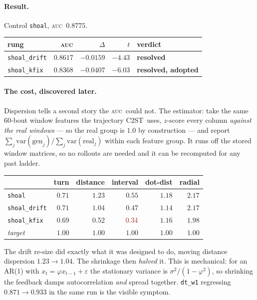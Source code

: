 \documentclass[11pt,a4paper]{article}
\newcommand{\win}[1]{\textcolor{winc}{\textbf{#1}}}
\newcommand{\lose}[1]{\textcolor{losec}{#1}}
\newcommand{\auc}{\textsc{auc}}
\newcommand{\ctst}{C2ST}
\newcommand{\code}[1]{\texttt{\small #1}}
\begin{document}
\paragraph{Result.} Control \code{shoal}, \auc\ $0.8775$.
\begin{center}\small
\begin{tabular}{lrrrl}
\toprule
rung & \auc{} & $\Delta$ & $t$ & verdict \\
\midrule
\code{shoal\_drift} & $0.8617$ & $-0.0159$ & $-4.43$ & \win{resolved} \\
\code{shoal\_kfix}  & $\mathbf{0.8368}$ & $\mathbf{-0.0407}$ & $-6.03$ & \win{resolved, adopted} \\
\bottomrule
\end{tabular}
\end{center}

\paragraph{The cost, discovered later.} Dispersion tells a second story the \auc\ could
not. The estimator: take the same 60-bout window features the trajectory \ctst\ uses,
$z$-score every column \emph{against the real windows} --- so the real group is $1.0$ by
construction --- and report $\sum_j \mathrm{var}(\text{gen}_j) / \sum_j
\mathrm{var}(\text{real}_j)$ within each feature group. It runs off the stored window
matrices, so no rollouts are needed and it can be recomputed for any past ladder.
\begin{center}\small
\begin{tabular}{lrrrrr}
\toprule
& turn & \textbf{distance} & \textbf{interval} & dot-dist & radial \\
\midrule
\code{shoal}       & $0.71$ & $1.23$ & $0.55$ & $1.18$ & $2.17$ \\
\code{shoal\_drift}& $0.71$ & $\mathbf{1.04}$ & $0.47$ & $1.14$ & $2.17$ \\
\code{shoal\_kfix} & $0.69$ & \lose{0.52} & $\lose{0.34}$ & $1.16$ & $1.98$ \\
\textit{target}    & $1.00$ & $1.00$ & $1.00$ & $1.00$ & $1.00$ \\
\bottomrule
\end{tabular}
\end{center}
The drift re-size did exactly what it was designed to do, moving distance dispersion
$1.23 \to 1.04$. The shrinkage then \emph{halved} it. This is mechanical: for an AR(1)
with $x_t = \varphi x_{t-1} + \varepsilon$ the stationary variance is
$\sigma^2/(1-\varphi^2)$, so shrinking the feedback damps autocorrelation \emph{and}
spread together. \code{dt\_w1} regressing $0.871 \to 0.933$ in the same run is the visible
symptom.
\end{document}
